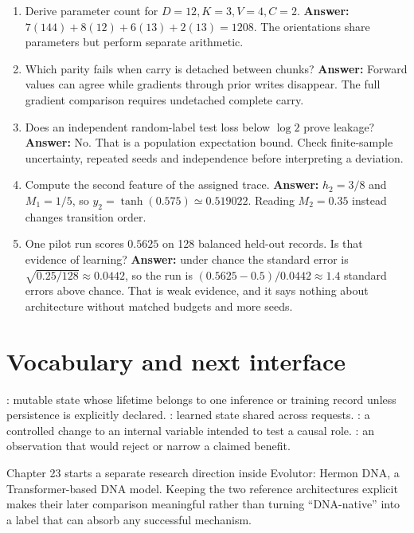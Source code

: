 \begin{enumerate}
compare matched recurrent, SSM and Transformer baselines; use multiple seeds,
calibration and out-of-distribution lengths; pre-register ablations; distinguish
task accuracy from biological mechanism claims.
\item Derive parameter count for $D=12,K=3,V=4,C=2$.
\textbf{Answer:} $7(144)+8(12)+6(13)+2(13)=1208$. The orientations share
parameters but perform separate arithmetic.
\item Which parity fails when carry is detached between chunks?
\textbf{Answer:} Forward values can agree while gradients through prior writes
disappear. The full gradient comparison requires undetached complete carry.
\item Does an independent random-label test loss below $\log2$ prove leakage?
\textbf{Answer:} No. That is a population expectation bound. Check finite-sample
uncertainty, repeated seeds and independence before interpreting a deviation.
\item Compute the second feature of the assigned trace.
\textbf{Answer:} $h_2=3/8$ and $M_1=1/5$, so
$y_2=\tanh(0.575)\simeq0.519022$. Reading $M_2=0.35$ instead changes
transition order.
\item One pilot run scores $0.5625$ on 128 balanced held-out records. Is that
evidence of learning? \textbf{Answer:} under chance the standard error is
$\sqrt{0.25/128}\approx0.0442$, so the run is $(0.5625-0.5)/0.0442\approx1.4$
standard errors above chance. That is weak evidence, and it says nothing about
architecture without matched budgets and more seeds.
\end{enumerate}

\section{Vocabulary and next interface}

: mutable state whose lifetime belongs to one inference or
training record unless persistence is explicitly declared. : learned state shared across requests. :
a controlled change to an internal variable intended to test a causal role.
: an observation that would reject or narrow a claimed
benefit.

Chapter 23 starts a separate research direction inside Evolutor: Hermon DNA, a
Transformer-based DNA model. Keeping the two reference architectures explicit makes
their later comparison meaningful rather than turning ``DNA-native'' into a label
that can absorb any successful mechanism.
